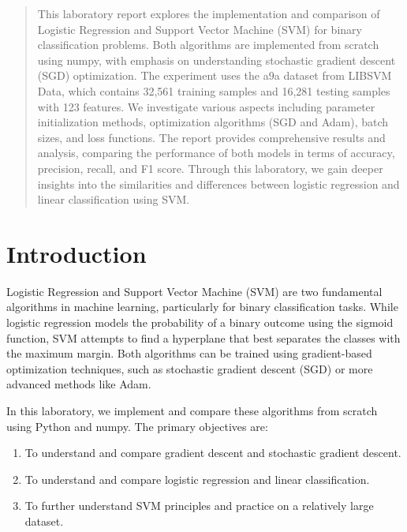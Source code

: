 \documentclass[journal, a4paper]{IEEEtran}
\begin{document}
\begin{abstract}
This laboratory report explores the implementation and comparison of Logistic Regression and Support Vector Machine (SVM) for binary classification problems. Both algorithms are implemented from scratch using numpy, with emphasis on understanding stochastic gradient descent (SGD) optimization. The experiment uses the a9a dataset from LIBSVM Data, which contains 32,561 training samples and 16,281 testing samples with 123 features. We investigate various aspects including parameter initialization methods, optimization algorithms (SGD and Adam), batch sizes, and loss functions. The report provides comprehensive results and analysis, comparing the performance of both models in terms of accuracy, precision, recall, and F1 score. Through this laboratory, we gain deeper insights into the similarities and differences between logistic regression and linear classification using SVM.
\end{abstract}


\section{Introduction}
Logistic Regression and Support Vector Machine (SVM) are two fundamental algorithms in machine learning, particularly for binary classification tasks. While logistic regression models the probability of a binary outcome using the sigmoid function, SVM attempts to find a hyperplane that best separates the classes with the maximum margin. Both algorithms can be trained using gradient-based optimization techniques, such as stochastic gradient descent (SGD) or more advanced methods like Adam.

In this laboratory, we implement and compare these algorithms from scratch using Python and numpy. The primary objectives are:

\begin{enumerate}
    \item To understand and compare gradient descent and stochastic gradient descent.
    \item To understand and compare logistic regression and linear classification.
    \item To further understand SVM principles and practice on a relatively large dataset.
\end{enumerate}
\end{document}
